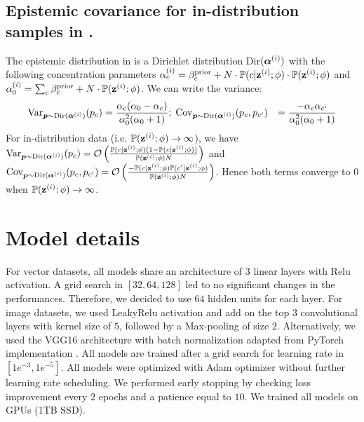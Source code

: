 \subsection{Epistemic covariance for in-distribution samples in \oursacro.}
\label{epistemic_variance_proof}

The epistemic distribution in \oursacro is a Dirichlet distribution Dir$(\bm{\alpha}^{(i)})$ with the following concentration parameters $\alpha_c^{(i)} = \beta_c^\text{prior} + N \cdot \mathbb{P}(c | \bold{z}^{(i)}; \phi) \cdot \mathbb{P}(\bold{z}^{(i)}; \phi)$ and $\alpha_0^{(i)} = \sum_c \beta_c^\text{prior} + N \cdot \mathbb{P}(\bold{z}^{(i)}; \phi)$. We can write the variance:
\begin{equation}
\begin{aligned}
\text{Var}_{\bm{p}\sim \mathrm{Dir}(\boldsymbol{\alpha}^{(i)})}(p_c) & = \frac{\alpha_c (\alpha_0 - \alpha_c)}{\alpha_0^2 (\alpha_0 + 1)}; \; \text{Cov}_{\bm{p}\sim \mathrm{Dir}(\boldsymbol{\alpha}^{(i)})}(p_c, p_{c'}) & = \frac{-\alpha_c\alpha_{c'}}{\alpha_0^2 (\alpha_0 + 1)}
\end{aligned}
\end{equation}
For in-distribution data (i.e. $\mathbb{P}(\bold{z}^{(i)}; \phi) \rightarrow \infty$), we have $\text{Var}_{\bm{p}\sim \mathrm{Dir}(\boldsymbol{\alpha}^{(i)})}(p_c) = \mathcal{O}\left(\frac{\mathbb{P}(c | \bold{z}^{(i)}; \phi)(1-\mathbb{P}(c | \bold{z}^{(i)}; \phi))}{\mathbb{P}(\bold{z}^{(i)}; \phi) N}\right)$ and $\text{Cov}_{\bm{p}\sim \mathrm{Dir}(\boldsymbol{\alpha}^{(i)})}(p_c, p_{c'}) = \mathcal{O}\left(\frac{-\mathbb{P}(c | \bold{z}^{(i)}; \phi)\mathbb{P}(c' | \bold{z}^{(i)}; \phi)}{\mathbb{P}(\bold{z}^{(i)}; \phi)N}\right)$. Hence both terms converge to $0$ when $\mathbb{P}(\bold{z}^{(i)}; \phi) \rightarrow \infty$.

\section{Model details}
\label{model_detais}

For vector datasets, all models share an architecture of 3 linear layers with Relu activation. A grid search in $[32, 64, 128]$ led to no significant changes in the performances. Therefore, we decided to use $64$ hidden units for each layer. For image datasets, we used LeakyRelu activation and add on the top 3 convolutional layers with kernel size of $5$, followed by a Max-pooling of size $2$. Alternatively, we used the VGG16 architecture with batch normalization \cite{vgg} adapted from PyTorch implementation \cite{pytorch}. All models are trained after a grid search for learning rate in $[1e^{-3}, 1e^{-5}]$. All models were optimized with Adam optimizer without further learning rate scheduling. We performed early stopping by checking loss improvement every $2$ epochs and a patience equal to $10$. We trained all models on GPUs (1TB SSD).

